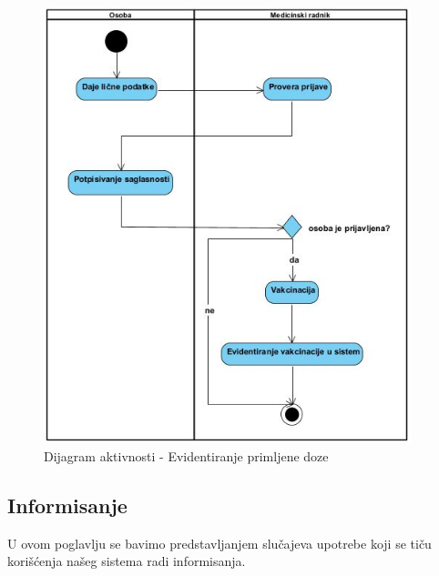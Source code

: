 \documentclass[titlepage]{article}
\begin{document}
\begin{center}
	\begin{figure}[H]
		\includegraphics[width=0.95\textwidth]{Vakcinacija}
		\caption{Dijagram aktivnosti - Evidentiranje primljene doze}
	\end{figure}
\end{center}

\subsection{Informisanje}

U ovom poglavlju se bavimo predstavljanjem slučajeva upotrebe koji se tiču korišćenja našeg sistema radi informisanja.
\end{document}
